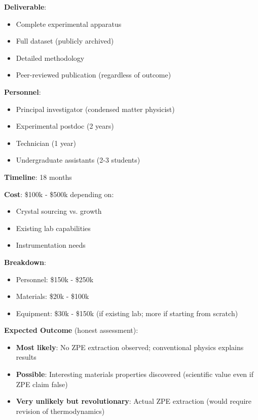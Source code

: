 \textbf{Deliverable}:
\begin{itemize}
    \item Complete experimental apparatus
    \item Full dataset (publicly archived)
    \item Detailed methodology
    \item Peer-reviewed publication (regardless of outcome)
\end{itemize}

\textbf{Personnel}:
\begin{itemize}
    \item Principal investigator (condensed matter physicist)
    \item Experimental postdoc (2 years)
    \item Technician (1 year)
    \item Undergraduate assistants (2-3 students)
\end{itemize}

\textbf{Timeline}: 18 months

\textbf{Cost}: \$100k - \$500k depending on:
\begin{itemize}
    \item Crystal sourcing vs. growth
    \item Existing lab capabilities
    \item Instrumentation needs
\end{itemize}

\textbf{Breakdown}:
\begin{itemize}
    \item Personnel: \$150k - \$250k
    \item Materials: \$20k - \$100k
    \item Equipment: \$30k - \$150k (if existing lab; more if starting from scratch)
\end{itemize}

\textbf{Expected Outcome} (honest assessment):
\begin{itemize}
    \item \textbf{Most likely}: No ZPE extraction observed; conventional physics explains results
    \item \textbf{Possible}: Interesting materials properties discovered (scientific value even if ZPE claim false)
    \item \textbf{Very unlikely but revolutionary}: Actual ZPE extraction (would require revision of thermodynamics)
\end{itemize}


